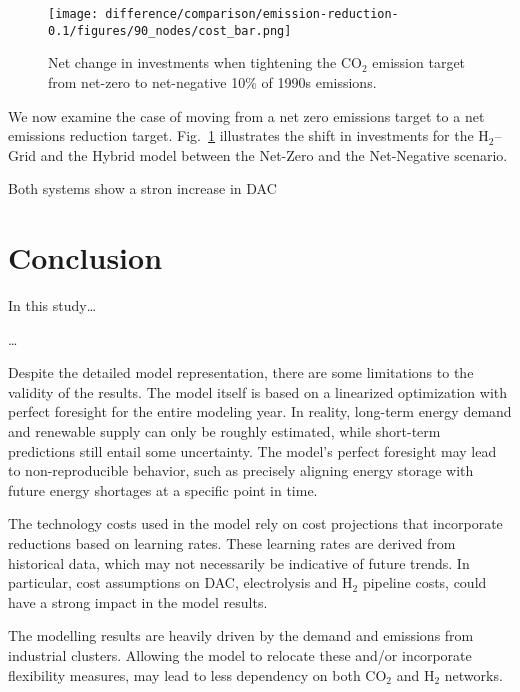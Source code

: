 \documentclass[twocolumn]{article}
\newcommand{\carbon}{CO$_2$}
\newcommand{\hydrogen}{H$_2$}
\newcommand{\hydrogengrid}{\hydrogen{}--Grid}
\begin{document}
\begin{figure}[htb!]
    \centering
    \texttt{[image: difference/comparison/emission-reduction-0.1/figures/90\_nodes/cost\_bar.png]}
    \caption[short]{Net change in investments when tightening the \carbon{} emission target from net-zero to net-negative 10\% of 1990s emissions.}
    \label{fig:net-negative_cost_bar}
\end{figure}


We now examine the case of moving from a net zero emissions target to a net emissions reduction target. Fig.~\ref{fig:net-negative_cost_bar} illustrates the shift in investments for the \hydrogengrid{} and the Hybrid model between the Net-Zero and the Net-Negative scenario.

Both systems show a stron increase in DAC


\section{Conclusion}
\label{sec:conclusion}


In this study\dots

\dots

Despite the detailed model representation, there are some limitations to the validity of the results. The model itself is based on a linearized optimization with perfect foresight for the entire modeling year. In reality, long-term energy demand and renewable supply can only be roughly estimated, while short-term predictions still entail some uncertainty. The model's perfect foresight may lead to non-reproducible behavior, such as precisely aligning energy storage with future energy shortages at a specific point in time.

The technology costs used in the model rely on cost projections that incorporate reductions based on learning rates. These learning rates are derived from historical data, which may not necessarily be indicative of future trends. In particular, cost assumptions on DAC, electrolysis and \hydrogen{} pipeline costs, could have a strong impact in the model results.

The modelling results are heavily driven by the demand and emissions from industrial clusters. Allowing the model to relocate these and/or incorporate flexibility measures, may lead to less dependency on both \carbon{} and \hydrogen{} networks.
\end{document}
